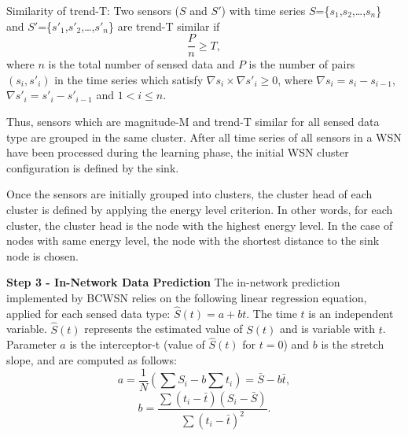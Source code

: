 \documentclass{acm_proc_article-sp}
\begin{document}
\begin{defini}
Similarity of trend-T: Two sensors ($S$ and $S'$) with time series
$S$=\{$s_{1}$,$s_{2}$,\ldots,$s_{n}$\} and
$S'$=\{$s'_{1}$,$s'_{2}$,\ldots,$s'_{n}$\} are trend-T similar if 
\begin{equation}
\label{equ:trend}
\frac{P}{n} \geq T,
\end{equation}
where $n$ is the total number of sensed data and $P$ is the number of pairs
$(s_{i},s'_{i})$ in the time series which satisfy $\nabla s_{i} \times \nabla
s'_{i} \geq 0$, where $\nabla s_{i} = s_{i} - s_{i-1}$, $\nabla
s'_{i} = s'_{i} - s'_{i-1}$ and $1 < i \leq n$.
\end{defini}
\vspace*{-.3cm}

Thus, sensors which are magnitude-M and trend-T similar for all sensed data
type are grouped in the same cluster. After all time series of all sensors
in a WSN have been processed during the learning phase, the initial WSN cluster
configuration is defined by the sink.
\vspace*{-.3cm}

Once the sensors are initially grouped into clusters, the cluster head of each
cluster is defined by applying the energy level criterion.
In other words, for each cluster, the cluster head is the node with the highest
energy level. In the case of nodes with same energy level, the node with the
shortest distance to the sink node is chosen.
\vspace*{-.3cm}

{\bf Step 3 - In-Network Data Prediction}
The in-network prediction implemented by BCWSN relies on the
following linear regression equation, applied for each sensed data type:
$\hat{S}(t) = a + bt$.
The time $t$ is an independent variable. $\hat{S}(t)$ represents the estimated
value of $S(t)$ and is variable with $t$. Parameter $a$ is the interceptor-t
(value of $\hat{S}(t)$ for $t=0$) and $b$ is the stretch slope, and are computed
as follows:
\begin{equation}
\label{coef-a}
	a = \frac{1}{N}\left(\sum S_{i} - b\sum t_{i} \right) = \bar{S} - b\bar{t},
\end{equation}
\vspace*{-.3cm}
\begin{equation}
\label{coef-b}
	b = \frac{\sum \left(t_{i} - \bar{t}\right)\left(S_{i} - \bar{S}\right)}{\sum \left(t_{i} - \bar{t}\right)^{2}}.
\end{equation}
\vspace*{-.3cm}
\end{document}
